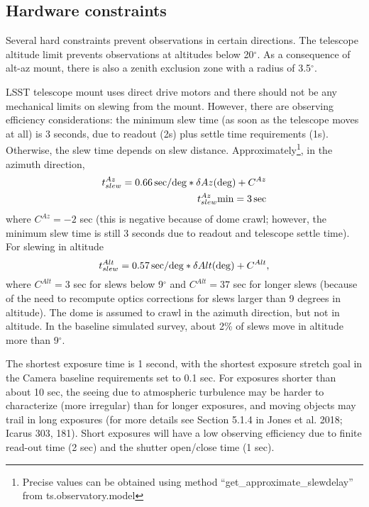 \documentclass[DM,lsstdraft,toc,usenatbib]{lsstdoc}
\begin{document}
\subsection{Hardware constraints \label{sec:HW}}

Several hard constraints prevent observations in certain directions. The telescope altitude limit
prevents observations at altitudes below 20$^\circ$.  As a consequence of alt-az mount, there
is also a zenith exclusion zone with a radius of 3.5$^\circ$. 

LSST telescope mount uses direct drive motors and there should not be any mechanical limits 
on slewing from the mount.  However, there are observing efficiency considerations: the minimum
slew time (as soon as the telescope moves at all) is 3 seconds, due to readout (2s) plus settle time requirements (1s). 
Otherwise, the slew time depends on slew distance. Approximately\footnote{Precise values can be obtained using
method ``get\_approximate\_slewdelay'' from ts.observatory.model}, in the azimuth direction, 
\begin{eqnarray}
             t_{slew}^{Az} = 0.66 \, {\rm sec/deg} * \delta Az ({\rm deg}) + C^{Az} \\
             t_{slew}^{Az} {\rm min} = 3\, {\rm sec}
\end{eqnarray} 
where $C^{Az} = -2$ sec (this is negative because of dome crawl; however, the minimum
slew time is still 3 seconds due to readout and telescope settle time). For slewing in altitude
\begin{equation}
             t_{slew}^{Alt} = 0.57 \, {\rm sec/deg} * \delta Alt ({\rm deg}) + C^{Alt} ,  
\end{equation} 
where $C^{Alt} = 3$ sec for slews below 9$^\circ$ and $C^{Alt} = 37$ sec for longer slews (because 
of the need to recompute optics corrections for slews larger than 9 degrees in altitude). 
The dome is assumed to crawl in the azimuth direction, but not in altitude. 
In the baseline simulated survey, about 2\% of slews move
in altitude more than 9$^\circ$. 

The shortest exposure time is 1 second, with the shortest exposure stretch goal in the Camera 
baseline requirements set to 0.1 sec. For exposures shorter than 
about 10 sec, the seeing due to atmospheric turbulence may be harder to characterize (more
irregular) than for longer exposures, and moving objects may trail in long exposures (for more
details see Section 5.1.4 in Jones et al. 2018; Icarus 303, 181). Short exposures will have a low
observing efficiency due to finite read-out time (2 sec) and the shutter open/close time (1 sec). 
\end{document}
